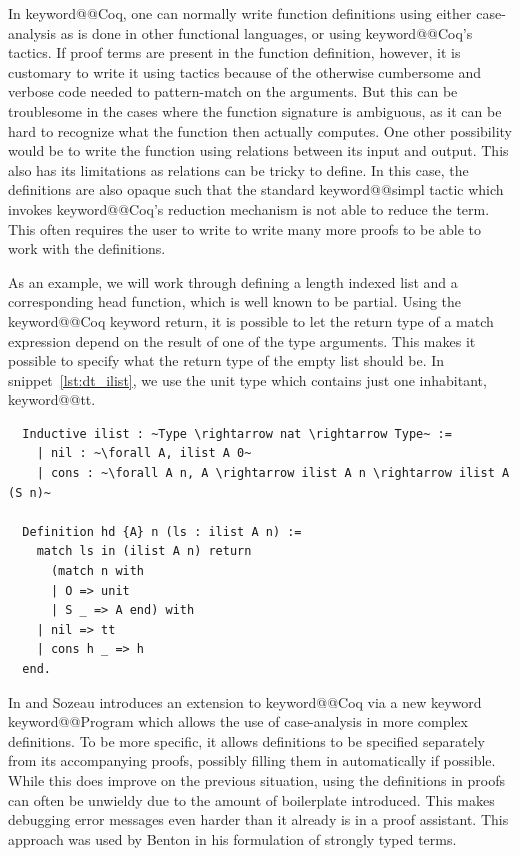 \documentclass[12pt, final]{article}
\makeatletter
\def\<#1>{\csname keyword@@#1\endcsname}
\makeatother
\begin{document}
In \<Coq>, one can normally write function definitions using either case-analysis as is done in other functional languages, or using \<Coq>'s tactics.
If proof terms are present in the function definition, however, it is customary to write it using tactics because of the otherwise cumbersome and verbose code needed to pattern-match on the arguments. But this can be troublesome in the cases where the function signature is ambiguous, as it can be hard to recognize what the function then actually computes.
One other possibility would be to write the function using relations between its input and output.
This also has its limitations as relations can be tricky to define. In this case, the definitions are also opaque such that the standard \<simpl> tactic which invokes \<Coq>'s reduction mechanism is not able to reduce the term.
This often requires the user to write to write many more proofs to be able to work with the definitions.

As an example, we will work through defining a length indexed list and a corresponding head function, which is well known to be partial.
Using the \<Coq> keyword return, it is possible to let the return type of a match expression depend on the result of one of the type arguments.
This makes it possible to specify what the return type of the empty list should be.
In snippet~\ref{lst:dt_ilist}, we use the unit type which contains just one inhabitant, \<tt>.

\begin{listing}
  \begin{verbatim}
  Inductive ilist : ~Type \rightarrow nat \rightarrow Type~ :=
    | nil : ~\forall A, ilist A 0~
    | cons : ~\forall A n, A \rightarrow ilist A n \rightarrow ilist A (S n)~

  Definition hd {A} n (ls : ilist A n) :=
    match ls in (ilist A n) return
      (match n with
      | O => unit
      | S _ => A end) with
    | nil => tt
    | cons h _ => h
  end.
  \end{verbatim}
  \caption{Definition of a length indexed list and hd using the return keyword, adapted from \cite{ChlipalaCPDT}.}
  \label{lst:dt_ilist}
\end{listing}

In \cite{Sozeau2006} and \cite{Sozeau2007} Sozeau introduces an extension to \<Coq> via a new keyword \<Program> which allows the use of case-analysis in more complex definitions.
To be more specific, it allows definitions to be specified separately from its accompanying proofs, possibly filling them in automatically if possible.
While this does improve on the previous situation, using the definitions in proofs can often be unwieldy due to the amount of boilerplate introduced.
This makes debugging error messages even harder than it already is in a proof assistant. This approach was used by Benton in his formulation of strongly typed terms.
\end{document}
